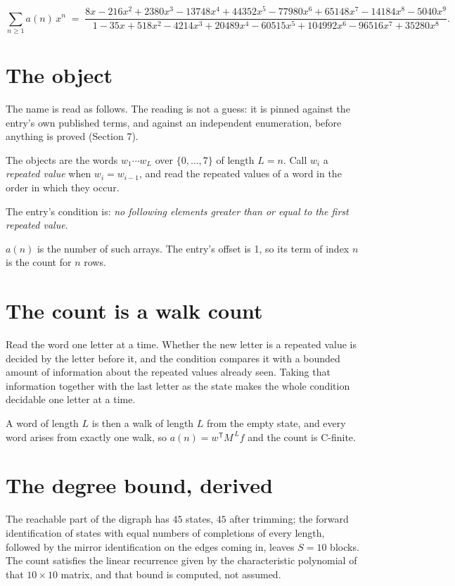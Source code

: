 \documentclass[11pt]{article}
\theoremstyle{definition}
\begin{document}
\[\sum_{n \ge 1} a(n)\,x^n \;=\; \frac{8x - 216x^{2} + 2380x^{3} - 13748x^{4} + 44352x^{5} - 77980x^{6} + 65148x^{7} - 14184x^{8} - 5040x^{9}}{1 - 35x + 518x^{2} - 4214x^{3} + 20489x^{4} - 60515x^{5} + 104992x^{6} - 96516x^{7} + 35280x^{8}}.\]

\section{The object}

The name is read as follows. The reading is not a guess: it is pinned against the entry's own published terms, and against an independent enumeration, before anything is proved (Section 7).

The objects are the words $w_1\cdots w_L$ over $\{0,\dots,7\}$ of length $L = n$. Call $w_i$ a {\itshape repeated value} when $w_i = w_{i-1}$, and read the repeated values of a word in the order in which they occur.

The entry's condition is: {\itshape no following elements greater than or equal to the first repeated value}.

$a(n)$ is the number of such arrays. The entry's offset is 1, so its term of index $n$ is the count for $n$ rows.

\section{The count is a walk count}

Read the word one letter at a time. Whether the new letter is a repeated value is decided by the letter before it, and the condition compares it with a bounded amount of information about the repeated values already seen. Taking that information together with the last letter as the state makes the whole condition decidable one letter at a time.

A word of length $L$ is then a walk of length $L$ from the empty state, and every word arises from exactly one walk, so $a(n) = w^{\mathsf T}M^{\,L}f$ and the count is C-finite.

\section{The degree bound, derived}

The reachable part of the digraph has $45$ states, $45$ after trimming; the forward identification of states with equal numbers of completions of every length, followed by the mirror identification on the edges coming in, leaves $S = 10$ blocks. The count satisfies the linear recurrence given by the characteristic polynomial of that $10\times10$ matrix, and that bound is computed, not assumed.
\end{document}
